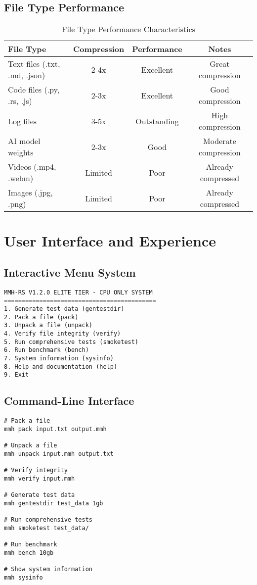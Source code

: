 \documentclass[12pt,a4paper]{article}
\begin{document}
\subsection{File Type Performance}
\begin{table}[h]
\centering
\begin{tabular}{|l|c|c|c|}
\hline
\textbf{File Type} & \textbf{Compression} & \textbf{Performance} & \textbf{Notes} \\
\hline
Text files (.txt, .md, .json) & 2-4x & Excellent & Great compression \\
Code files (.py, .rs, .js) & 2-3x & Excellent & Good compression \\
Log files & 3-5x & Outstanding & High compression \\
AI model weights & 2-3x & Good & Moderate compression \\
Videos (.mp4, .webm) & Limited & Poor & Already compressed \\
Images (.jpg, .png) & Limited & Poor & Already compressed \\
\hline
\end{tabular}
\caption{File Type Performance Characteristics}
\end{table}

\newpage

\section{User Interface and Experience}

\subsection{Interactive Menu System}
\begin{lstlisting}[caption=Main Menu Options]
MMH-RS V1.2.0 ELITE TIER - CPU ONLY SYSTEM
===========================================
1. Generate test data (gentestdir)
2. Pack a file (pack)
3. Unpack a file (unpack)
4. Verify file integrity (verify)
5. Run comprehensive tests (smoketest)
6. Run benchmark (bench)
7. System information (sysinfo)
8. Help and documentation (help)
9. Exit
\end{lstlisting}

\subsection{Command-Line Interface}
\begin{lstlisting}[caption=Basic Commands]
# Pack a file
mmh pack input.txt output.mmh

# Unpack a file
mmh unpack input.mmh output.txt

# Verify integrity
mmh verify input.mmh

# Generate test data
mmh gentestdir test_data 1gb

# Run comprehensive tests
mmh smoketest test_data/

# Run benchmark
mmh bench 10gb

# Show system information
mmh sysinfo
\end{lstlisting}
\end{document}
